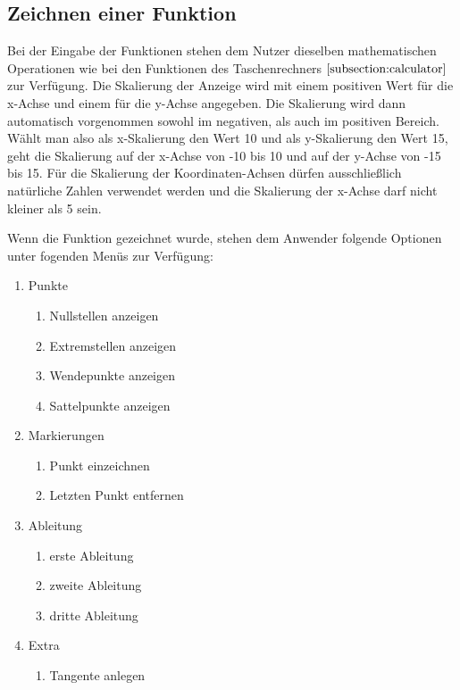 \documentclass[12pt,a4paper]{article}
\begin{document}
    \subsection{Zeichnen einer Funktion}
    Bei der Eingabe der Funktionen stehen dem Nutzer dieselben mathematischen Operationen wie bei den Funktionen
    des Taschenrechners $\ref{subsection:calculator}$ zur Verfügung.
    Die Skalierung der Anzeige wird mit einem positiven Wert für die x-Achse und einem für die y-Achse angegeben.
    Die Skalierung wird dann automatisch vorgenommen sowohl im negativen, als auch im positiven Bereich.
    Wählt man also als x-Skalierung den Wert 10 und als y-Skalierung den Wert 15,
    geht die Skalierung auf der x-Achse von -10 bis 10 und auf der y-Achse von -15 bis 15.
    Für die Skalierung der Koordinaten-Achsen dürfen ausschließlich natürliche Zahlen verwendet werden und die Skalierung
    der x-Achse darf nicht kleiner als 5 sein.\par

    \newpage

    Wenn die Funktion gezeichnet wurde, stehen dem Anwender folgende Optionen unter fogenden Menüs zur Verfügung:

        {
        \renewcommand{\labelenumi}{\textbf{\Alph{enumi}}}
        \renewcommand{\labelenumii}{\arabic{enumii}}

        \begin{enumerate}
            \item Punkte
            \begin{enumerate}
                \item Nullstellen anzeigen
                \item Extremstellen anzeigen
                \item Wendepunkte anzeigen
                \item Sattelpunkte anzeigen
            \end{enumerate}

            \item Markierungen
            \begin{enumerate}
                \item Punkt einzeichnen
                \item Letzten Punkt entfernen
            \end{enumerate}

            \item Ableitung
            \begin{enumerate}
                \item erste Ableitung
                \item zweite Ableitung
                \item dritte Ableitung
            \end{enumerate}
            \item Extra
            \begin{enumerate}
                \item Tangente anlegen
            \end{enumerate}
        \end{enumerate}
    }
\end{document}
